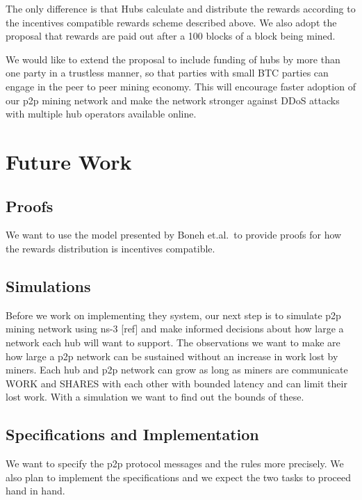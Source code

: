 \documentclass{article}
\begin{document}
The only difference
is that Hubs calculate and distribute the rewards according to the
incentives compatible rewards scheme described above. We also adopt
the proposal that rewards are paid out after a 100 blocks of a block
being mined.

We would like to extend the proposal to include funding of hubs by
more than one party in a trustless manner, so that parties with small
BTC parties can engage in the peer to peer mining economy. This will
encourage faster adoption of our p2p mining network and make the
network stronger against DDoS attacks with multiple hub operators
available online.




   

\section{Future Work}

\subsection{Proofs}

We want to use the model presented by Boneh et.al.\ to provide proofs
for how the rewards distribution is incentives compatible.

\subsection{Simulations}
Before we work on implementing they system, our next step is to
simulate p2p mining network using ns-3 [ref] and make informed
decisions about how large a network each hub will want to support. The
observations we want to make are how large a p2p network can be
sustained without an increase in work lost by miners. Each hub and p2p
network can grow as long as miners are communicate WORK and SHARES
with each other with bounded latency and can limit their lost
work. With a simulation we want to find out the bounds of these.

\subsection{Specifications and Implementation}

We want to specify the p2p protocol messages and the rules more
precisely. We also plan to implement the specifications and we expect
the two tasks to proceed hand in hand.

 

\end{document}

